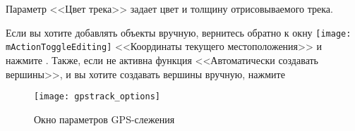 Параметр <<Цвет трека>> задает цвет и толщину отрисовываемого трека.

Если вы хотите добавлять объекты вручную, вернитесь обратно к окну
\texttt{[image: mActionToggleEditing]} <<Координаты
текущего местоположения>> и нажмите . Также, если
не активна функция <<Автоматически создавать вершины>>, и вы хотите создавать
вершины вручную, нажмите 

\begin{figure}[ht]
   \centering
   \texttt{[image: gpstrack\_options]}
   \caption{Окно параметров GPS-слежения \wincaption}
   \label{fig:gpstrack_options}
\end{figure}

\FloatBarrier

